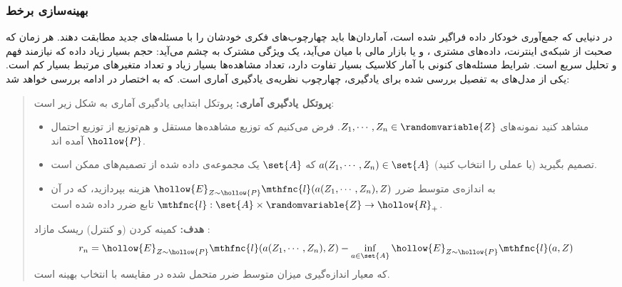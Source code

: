 
% 
%
%
%
%
%
%
%
%
%
%
%

\subsubsection{
بهینه‌سازی برخط
\cite{onlinelearningbubeck}
}


در دنیایی که جمع‌آوری خودکار داده فراگیر شده است، آماردان‌ها باید چهارچوب‌های فکری خودشان را با مسئله‌های جدید مطابقت دهند. هر زمان که صحبت از شبکه‌ی اینترنت، داده‌های مشتری
، و یا بازار مالی
 با میان می‌آید، یک ویژگی مشترک به چشم می‌آید: حجم بسیار زیاد داده که نیازمند فهم و تحلیل سریع است. شرایط مسئله‌های کنونی با آمار کلاسیک بسیار تفاوت دارد، تعداد مشاهده‌ها بسیار زیاد و تعداد متغیرهای مرتبط بسیار کم است. یکی از مدل‌های به تفصیل بررسی شده برای یادگیری، چهارچوب نظریه‌ی یادگیری آماری است. که به اختصار در ادامه بررسی خواهد شد:

\begin{quote}
{\bf
پروتکل
 یادگیری آماری:
} 
پروتکل ابتدایی یادگیری آماری به شکل زیر است:
\begin{itemize}
\item
مشاهد کنید نمونه‌های 
$Z_1, \cdots, Z_n \in \randomvariable{Z}$. 
فرض می‌کنیم که توزیع مشاهده‌ها مستقل و هم‌توزیع
 از توزیع احتمال 
$\hollow{P}$
آمده اند.

\item
تصمیم بگیرید (یا عملی را انتخاب کنید) 
$a( Z_1, \cdots, Z_n ) \in \set{A}$ 
که 
$\set{A}$ 
یک مجموعه‌ی داده شده از تصمیم‌های ممکن است.

\item
به اندازه‌ی متوسط ضرر
$\hollow{E}_{Z \sim \hollow{P}} \mthfnc{l}( a(Z_1,\cdots,Z_n), Z )$ 
هزینه بپردازید، که در آن 
$\mthfnc{l} : \set{A} \times \randomvariable{Z} \rightarrow \hollow{R}_+$ 
تابع ضرر داده شده است.
\end{itemize}

{\bf
هدف:
} 
کمینه کردن (و کنترل) ریسک مازاد
:
\[
r_n = \hollow{E}_{Z \sim \hollow{P}} \mthfnc{l}( a(Z_1, \cdots, Z_n), Z ) - \inf_{a \in \set{A}} \hollow{E}_{Z \sim \hollow{P}} \mthfnc{l} ( a, Z )
\]
که معیار اندازه‌گیری میزان متوسط ضرر متحمل شده در مقایسه با انتخاب بهینه است.

\end{quote}



